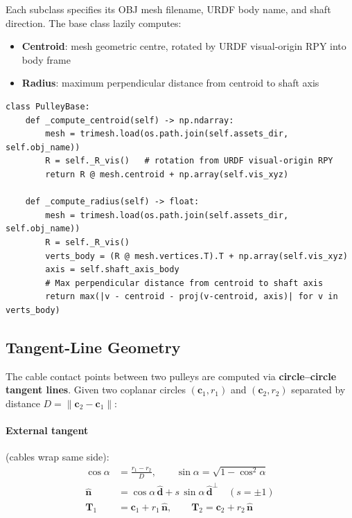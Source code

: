\documentclass[11pt,a4paper]{article}
\begin{document}
Each subclass specifies its OBJ mesh filename, URDF body name, and shaft direction.  The base class lazily computes:
\begin{itemize}[leftmargin=2em]
    \item \textbf{Centroid}: mesh geometric centre, rotated by URDF visual-origin RPY into body frame
    \item \textbf{Radius}: maximum perpendicular distance from centroid to shaft axis
\end{itemize}

\begin{lstlisting}[caption={PulleyBase mesh property computation --- \texttt{cable.py}}]
class PulleyBase:
    def _compute_centroid(self) -> np.ndarray:
        mesh = trimesh.load(os.path.join(self.assets_dir, self.obj_name))
        R = self._R_vis()   # rotation from URDF visual-origin RPY
        return R @ mesh.centroid + np.array(self.vis_xyz)

    def _compute_radius(self) -> float:
        mesh = trimesh.load(os.path.join(self.assets_dir, self.obj_name))
        R = self._R_vis()
        verts_body = (R @ mesh.vertices.T).T + np.array(self.vis_xyz)
        axis = self.shaft_axis_body
        # Max perpendicular distance from centroid to shaft axis
        return max(|v - centroid - proj(v-centroid, axis)| for v in verts_body)
\end{lstlisting}

\subsection{Tangent-Line Geometry}

The cable contact points between two pulleys are computed via \textbf{circle--circle tangent lines}.  Given two coplanar circles $(\bm{c}_1, r_1)$ and $(\bm{c}_2, r_2)$ separated by distance $D = \|\bm{c}_2 - \bm{c}_1\|$:

\paragraph{External tangent} (cables wrap same side):
\begin{align}
    \cos\alpha &= \frac{r_1 - r_2}{D}, \qquad \sin\alpha = \sqrt{1 - \cos^2\alpha} \nonumber \\
    \hat{\bm{n}} &= \cos\alpha\,\hat{\bm{d}} + s\,\sin\alpha\,\hat{\bm{d}}^\perp \quad (s = \pm 1) \nonumber \\
    \bm{T}_1 &= \bm{c}_1 + r_1\,\hat{\bm{n}}, \qquad \bm{T}_2 = \bm{c}_2 + r_2\,\hat{\bm{n}}
    \label{eq:ext_tangent}
\end{align}
\end{document}
